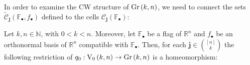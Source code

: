 In order to examine the CW structure of $\Gr{k}{n}$, we need to connect the sets $\tilde{\mathcal{C}}_{\mathbf{j}}(\mathbb{F}_{\bullet},f_{\bullet})$ defined to the cells $\mathcal{C}_{\mathbf{j}}(\mathbb{F}_{\bullet})$:
\begin{lemma}\label{lem:cells_from_stiefel_to_gr} Let $k,n\in\mathbb{N}$, with $0<k<n$. Moreover, let $\mathbb{F}_{\bullet}$ be a flag of $\mathbb{R}^n$ and $f_{\bullet}$ be an orthonormal basis of $\mathbb{R}^n$ compatible with $\mathbb{F}_{\bullet}$. Then, for each $\mathbf{j}\in\binom{[n]}{k}$ the following restriction of $q_0:\StO{k}{n}\to\Gr{k}{n}$ is a homeomorphism:
\begin{center}
\end{center}
\end{lemma}
